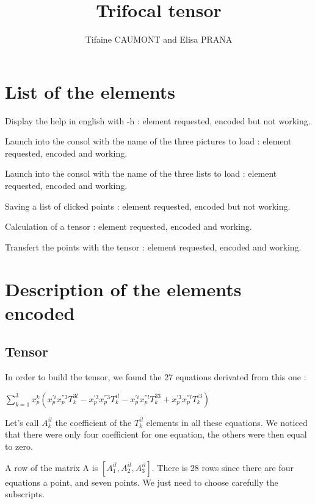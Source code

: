 \documentclass{report}
\begin{document}
\title{Trifocal tensor}
\author{Tifaine CAUMONT and Elisa PRANA}
\maketitle

\tableofcontents
\newpage

\section{List of the elements}
\begin{list}{•}{•}
\item 
Display the help in english with -h : element requested, encoded but not working. 
\item
Launch into the consol with the name of the three pictures to load : element requested, encoded and working. 
\item
Launch into the consol with the name of the three lists to load : element requested, encoded and working. 
\item
Saving a list of clicked points : element requested, encoded but not working. 
\item
Calculation of a tensor : element requested, encoded and working. 
\item
Transfert the points with the tensor : element requested, encoded and working. 

\end{list}

\section{Description of the elements encoded}
\subsection{Tensor}
In order to build the tensor, we found the 27 equations derivated from this one :
\begin{center}
 $ \displaystyle { \sum_{k = 1}^{3}} x_{p}^{k}(x_{p}^{'i}x_{p}^{''3}T_{k}^{3l} - x_{p}^{'3}x_{p}^{''3}T_{k}^{il} - x_{p}^{'i}x_{p}^{''l}T_{k}^{33} + x_{p}^{'3}x_{p}^{''l}T_{k}^{i3})$ 
\end{center}

Let's call $A_{k}^{il}$ the coefficient of the $T_{k}^{il}$ elements in all these equations. We noticed that there were only four coefficient for one equation, the others were then equal to zero. 

A row of the matrix A is  $[ A_{1}^{il}, A_{2}^{il}, A_{3}^{il} ]$. There is 28 rows since there are four equations a point, and seven points. We just need to choose carefully the subscripts. 
\end{document}
